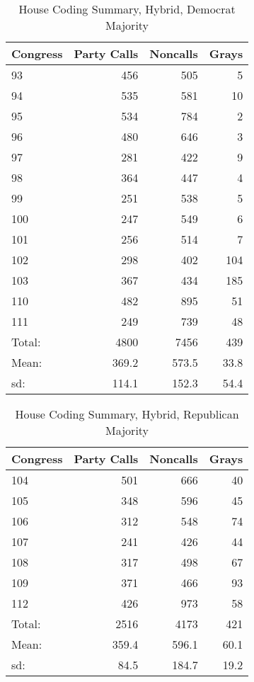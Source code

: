 \documentclass[12pt]{article}
\begin{document}
\begin{table}[H]
	\caption{House Coding Summary, Hybrid, Democrat Majority}
	\centering
	\begin{tabular}{lrrr}
		\hline
		Congress & Party Calls & Noncalls & Grays \\ 
		\hline
		93 & 456 & 505 &   5 \\ 
		94 & 535 & 581 &  10 \\ 
		95 & 534 & 784 &   2 \\ 
		96 & 480 & 646 &   3 \\ 
		97 & 281 & 422 &   9 \\ 
		98 & 364 & 447 &   4 \\ 
		99 & 251 & 538 &   5 \\ 
		100 & 247 & 549 &   6 \\ 
		101 & 256 & 514 &   7 \\ 
		102 & 298 & 402 & 104 \\ 
		103 & 367 & 434 & 185 \\ 
		110 & 482 & 895 &  51 \\ 
		111 & 249 & 739 &  48 \\ 
		\hline
		Total: & 4800 & 7456 & 439 \\
		Mean: & 369.2 & 573.5 & 33.8 \\
		sd: & 114.1 & 152.3 & 54.4 \\
		\hline
	\end{tabular}
\end{table}

\begin{table}[H]
	\caption{House Coding Summary, Hybrid, Republican Majority}
	\centering
	\begin{tabular}{lrrr}
		\hline
		Congress & Party Calls & Noncalls & Grays \\ 
		\hline
		104 & 501 & 666 &  40 \\ 
		105 & 348 & 596 &  45 \\ 
		106 & 312 & 548 &  74 \\ 
		107 & 241 & 426 &  44 \\ 
		108 & 317 & 498 &  67 \\ 
		109 & 371 & 466 &  93 \\ 
		112 & 426 & 973 &  58 \\ 
		\hline
		Total: & 2516 & 4173 & 421 \\
		Mean: & 359.4 & 596.1 & 60.1 \\
		sd: & 84.5 & 184.7 & 19.2 \\
		\hline
	\end{tabular}
\end{table}
\end{document}
